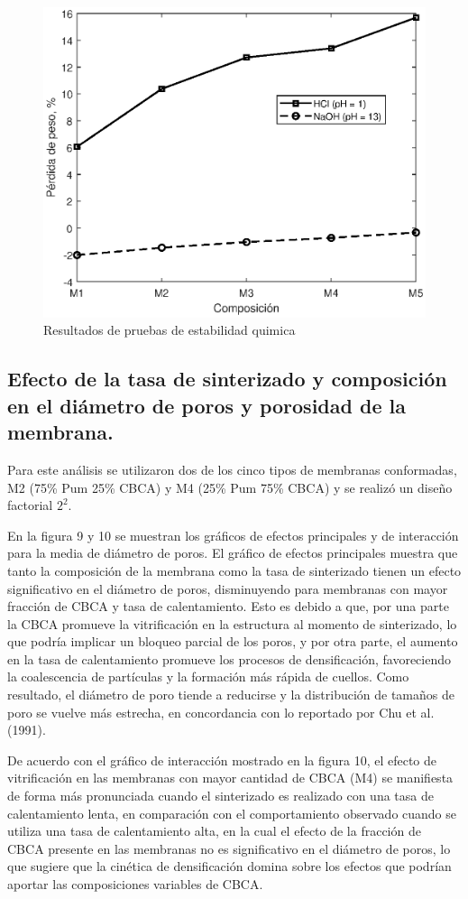 \documentclass{article}
\begin{document}
\begin{figure}[ht]
    \centering
    \includegraphics[width=0.5\linewidth]{Graphics/ChemStability.eps}
    \caption{Resultados de pruebas de estabilidad quimica}
    \label{fig:EstabilidadQuimica}
\end{figure}

\subsection{Efecto de la tasa de sinterizado y composición en el diámetro de poros y porosidad de la membrana. }

Para este análisis se utilizaron dos de los cinco tipos de membranas 
conformadas, M2 (75\% Pum 25\% CBCA) y M4 (25\% Pum 75\% CBCA) y se 
realizó un diseño factorial $2^2$.

En la figura 9 y 10 se muestran los gráficos de efectos principales 
y de interacción para la media de diámetro de poros. El gráfico de 
efectos principales muestra que tanto la composición de la membrana 
como la tasa de sinterizado tienen un efecto significativo en el 
diámetro de poros, disminuyendo para membranas con mayor fracción de 
CBCA y tasa de calentamiento. Esto es debido a que, por una parte la 
CBCA promueve la vitrificación en la estructura al momento de 
sinterizado, lo que podría implicar un bloqueo parcial de los poros, 
y por otra parte, el aumento en la tasa de calentamiento promueve los 
procesos de densificación, favoreciendo la coalescencia de partículas 
y la formación más rápida de cuellos. Como resultado, el diámetro de 
poro tiende a reducirse y la distribución de tamaños de poro se 
vuelve más estrecha, en concordancia con lo reportado por Chu et al. (1991). 

De acuerdo con el gráfico de interacción mostrado en la figura 10, 
el efecto de vitrificación en las membranas con mayor cantidad de 
CBCA (M4) se manifiesta de forma más pronunciada cuando el 
sinterizado es realizado con una tasa de calentamiento lenta, 
en comparación con el comportamiento observado cuando se utiliza una 
tasa de calentamiento alta, en la cual el efecto de la fracción de 
CBCA presente en las membranas no es significativo en el diámetro de 
poros, lo que sugiere que la cinética de densificación domina sobre 
los efectos que podrían aportar las composiciones variables de CBCA. 
\end{document}

